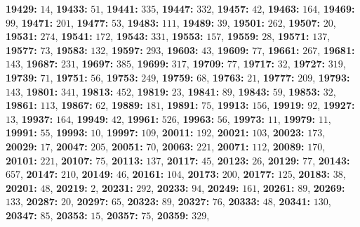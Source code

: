 \textsf{\bfseries 19429:} $14$, \textsf{\bfseries 19433:} $51$, \textsf{\bfseries 19441:} $335$, \textsf{\bfseries 19447:} $332$, \textsf{\bfseries 19457:} $42$, \textsf{\bfseries 19463:} $164$, \textsf{\bfseries 19469:} $99$, \textsf{\bfseries 19471:} $201$, \textsf{\bfseries 19477:} $53$, \textsf{\bfseries 19483:} $111$, \textsf{\bfseries 19489:} $39$, \textsf{\bfseries 19501:} $262$, \textsf{\bfseries 19507:} $20$, \textsf{\bfseries 19531:} $274$, \textsf{\bfseries 19541:} $172$, \textsf{\bfseries 19543:} $331$, \textsf{\bfseries 19553:} $157$, \textsf{\bfseries 19559:} $28$, \textsf{\bfseries 19571:} $137$, \textsf{\bfseries 19577:} $73$, \textsf{\bfseries 19583:} $132$, \textsf{\bfseries 19597:} $293$, \textsf{\bfseries 19603:} $43$, \textsf{\bfseries 19609:} $77$, \textsf{\bfseries 19661:} $267$, \textsf{\bfseries 19681:} $143$, \textsf{\bfseries 19687:} $231$, \textsf{\bfseries 19697:} $385$, \textsf{\bfseries 19699:} $317$, \textsf{\bfseries 19709:} $77$, \textsf{\bfseries 19717:} $32$, \textsf{\bfseries 19727:} $319$, \textsf{\bfseries 19739:} $71$, \textsf{\bfseries 19751:} $56$, \textsf{\bfseries 19753:} $249$, \textsf{\bfseries 19759:} $68$, \textsf{\bfseries 19763:} $21$, \textsf{\bfseries 19777:} $209$, \textsf{\bfseries 19793:} $143$, \textsf{\bfseries 19801:} $341$, \textsf{\bfseries 19813:} $452$, \textsf{\bfseries 19819:} $23$, \textsf{\bfseries 19841:} $89$, \textsf{\bfseries 19843:} $59$, \textsf{\bfseries 19853:} $32$, \textsf{\bfseries 19861:} $113$, \textsf{\bfseries 19867:} $62$, \textsf{\bfseries 19889:} $181$, \textsf{\bfseries 19891:} $75$, \textsf{\bfseries 19913:} $156$, \textsf{\bfseries 19919:} $92$, \textsf{\bfseries 19927:} $13$, \textsf{\bfseries 19937:} $164$, \textsf{\bfseries 19949:} $42$, \textsf{\bfseries 19961:} $526$, \textsf{\bfseries 19963:} $56$, \textsf{\bfseries 19973:} $11$, \textsf{\bfseries 19979:} $11$, \textsf{\bfseries 19991:} $55$, \textsf{\bfseries 19993:} $10$, \textsf{\bfseries 19997:} $109$, \textsf{\bfseries 20011:} $192$, \textsf{\bfseries 20021:} $103$, \textsf{\bfseries 20023:} $173$, \textsf{\bfseries 20029:} $17$, \textsf{\bfseries 20047:} $205$, \textsf{\bfseries 20051:} $70$, \textsf{\bfseries 20063:} $221$, \textsf{\bfseries 20071:} $112$, \textsf{\bfseries 20089:} $170$, \textsf{\bfseries 20101:} $221$, \textsf{\bfseries 20107:} $75$, \textsf{\bfseries 20113:} $137$, \textsf{\bfseries 20117:} $45$, \textsf{\bfseries 20123:} $26$, \textsf{\bfseries 20129:} $77$, \textsf{\bfseries 20143:} $657$, \textsf{\bfseries 20147:} $210$, \textsf{\bfseries 20149:} $46$, \textsf{\bfseries 20161:} $104$, \textsf{\bfseries 20173:} $200$, \textsf{\bfseries 20177:} $125$, \textsf{\bfseries 20183:} $38$, \textsf{\bfseries 20201:} $48$, \textsf{\bfseries 20219:} $2$, \textsf{\bfseries 20231:} $292$, \textsf{\bfseries 20233:} $94$, \textsf{\bfseries 20249:} $161$, \textsf{\bfseries 20261:} $89$, \textsf{\bfseries 20269:} $133$, \textsf{\bfseries 20287:} $20$, \textsf{\bfseries 20297:} $65$, \textsf{\bfseries 20323:} $89$, \textsf{\bfseries 20327:} $76$, \textsf{\bfseries 20333:} $48$, \textsf{\bfseries 20341:} $130$, \textsf{\bfseries 20347:} $85$, \textsf{\bfseries 20353:} $15$, \textsf{\bfseries 20357:} $75$, \textsf{\bfseries 20359:} $329$, 
